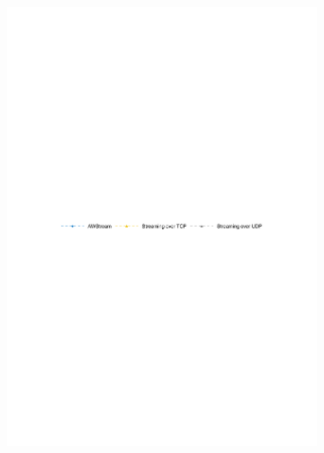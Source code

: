 \begin{figure}
  \begin{subfigure}{\linewidth}
    \centering
    \includegraphics[width=0.9\columnwidth]{figures/runtime-legend.pdf}
  \end{subfigure}


\end{figure}
